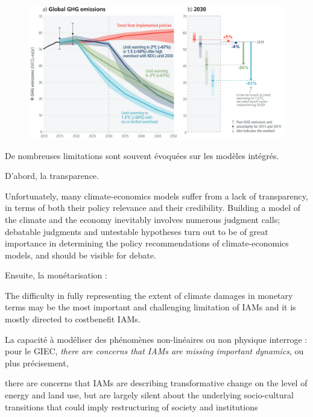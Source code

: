 \begin{figure}
    \centering
    \includegraphics[width=0.9\linewidth]{figures/spm2_5.png}
    \label{fig:ipcc-pathways}
\end{figure}

De nombreuses limitations sont souvent évoquées sur les modèles intégrés. 

D'abord, la transparence.

\begin{displayquote}
    Unfortunately, many climate-economics models suffer from a lack of transparency, in terms of both their policy relevance and their credibility. Building a model of the climate and the economy inevitably involves numerous judgment calls; debatable judgments and untestable hypotheses turn out to be of great importance in determining the policy recommendations of climate-economics models, and should be visible for debate. \cite{stanton_inside_2009}
\end{displayquote}

Ensuite, la monétarisation : 

\begin{displayquote}
    The difficulty in fully representing the extent of climate damages in monetary terms may be the most important and challenging limitation of IAMs and it is mostly directed to costbenefit IAMs. \cite{intergovernmental_panel_on_climate_change_ipcc_annex_2023}
\end{displayquote}

La capacité à modéliser des phénomènes non-linéaires ou non physique interroge : pour le GIEC, \emph{there are concerns that IAMs are missing important dynamics}, ou plus précisement, 

\begin{displayquote}
    there are concerns that IAMs are describing transformative change on the level of energy and land use, but are largely silent about the underlying socio-cultural transitions that could imply restructuring of society and institutions
\end{displayquote}

